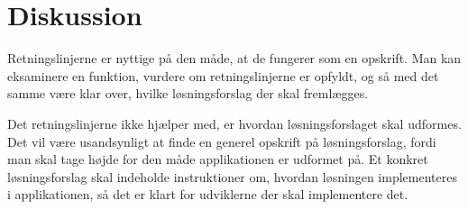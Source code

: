 \documentclass[a4paper]{article}
\begin{document}
\section{Diskussion}

Retningslinjerne er nyttige på den måde, at de fungerer som en opskrift. Man kan
eksaminere en funktion, vurdere om retningslinjerne er opfyldt, og så med det
samme være klar over, hvilke løsningsforslag der skal fremlægges.

Det retningslinjerne ikke hjælper med, er hvordan løsningsforslaget skal
udformes. Det vil være usandsynligt at finde en generel opskrift på
løsningsforslag, fordi man skal tage højde for den måde applikationen er
udformet på. Et konkret løsningsforslag skal indeholde instruktioner om, hvordan
løsningen implementeres i applikationen, så det er klart for udviklerne der skal
implementere det.
\end{document}
